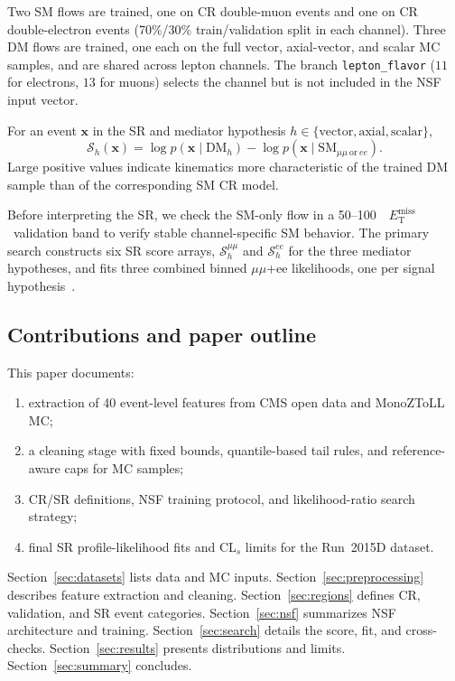 \documentclass[11pt,a4paper,twocolumn]{article}
\newcommand{\GeV}{\text{GeV}}
\newcommand{\MET}{\ensuremath{E_{\mathrm{T}}^{\mathrm{miss}}}}
\newcommand{\score}{\ensuremath{\mathcal{S}}}
\begin{document}
Two SM flows are trained, one on CR double-muon events and one on CR double-electron events
(70\%/30\% train/validation split in each channel).
Three DM flows are trained, one each on the full vector, axial-vector, and scalar MC
samples, and are shared across lepton channels.
The branch \texttt{lepton\_flavor} ($11$ for electrons, $13$ for muons) selects the channel
but is not included in the NSF input vector.

For an event $\mathbf{x}$ in the SR and mediator hypothesis
$h\in\{\mathrm{vector},\mathrm{axial},\mathrm{scalar}\}$,
\begin{equation}
  \score_h(\mathbf{x}) =
  \log p(\mathbf{x}\mid\mathrm{DM}_h) -
  \log p(\mathbf{x}\mid\mathrm{SM}_{\mu\mu\ \mathrm{or}\ ee}).
  \label{eq:score}
\end{equation}
Large positive values indicate kinematics more characteristic of the trained DM sample
than of the corresponding SM CR model.

Before interpreting the SR, we check the SM-only flow in a 50--100~\GeV\ \MET\
validation band to verify stable channel-specific SM behavior. The primary search
constructs six SR score arrays, $\score_h^{\mu\mu}$ and $\score_h^{ee}$ for the
three mediator hypotheses, and fits three combined binned $\mu\mu$+ee likelihoods,
one per signal hypothesis~\cite{Cowan2011}.

\subsection{Contributions and paper outline}
\label{sec:outline}

This paper documents:
\begin{enumerate}
  \item extraction of 40 event-level features from CMS open data and MonoZToLL MC;
  \item a cleaning stage with fixed bounds, quantile-based tail rules, and reference-aware
        caps for MC samples;
  \item CR/SR definitions, NSF training protocol, and likelihood-ratio search strategy;
  \item final SR profile-likelihood fits and CL$_s$ limits for the Run~2015D dataset.
\end{enumerate}

Section~\ref{sec:datasets} lists data and MC inputs.
Section~\ref{sec:preprocessing} describes feature extraction and cleaning.
Section~\ref{sec:regions} defines CR, validation, and SR event categories.
Section~\ref{sec:nsf} summarizes NSF architecture and training.
Section~\ref{sec:search} details the score, fit, and cross-checks.
Section~\ref{sec:results} presents distributions and limits.
Section~\ref{sec:summary} concludes.
\end{document}
